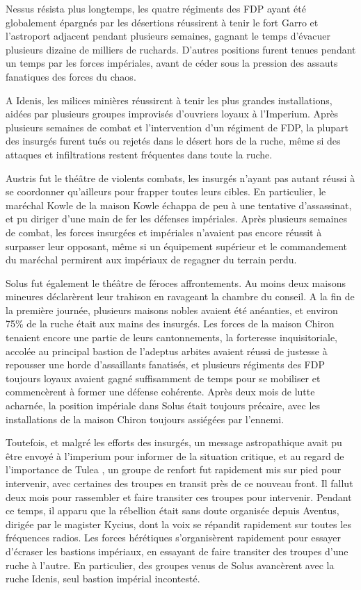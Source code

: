 \documentclass[10pt,a4paper]{book}
\newcommand{\zone}{Tulea }
\begin{document}
Nessus résista plus longtemps, les quatre régiments des FDP ayant été globalement épargnés par les désertions réussirent à tenir le fort Garro et l'astroport adjacent pendant plusieurs semaines, gagnant le temps d'évacuer plusieurs dizaine de milliers de ruchards. D'autres positions furent tenues pendant un temps par les forces impériales, avant de céder sous la pression des assauts fanatiques des forces du chaos.

A Idenis, les milices minières réussirent à tenir les plus grandes installations, aidées par plusieurs groupes improvisés d'ouvriers loyaux à l'Imperium. Après plusieurs semaines de combat et l'intervention d'un régiment de FDP, la plupart des insurgés furent tués ou rejetés dans le désert hors de la ruche, même si des attaques et infiltrations restent fréquentes dans toute la ruche.

Austris fut le théâtre de violents combats, les insurgés n'ayant pas autant réussi à se coordonner qu'ailleurs pour frapper toutes leurs cibles. En particulier, le maréchal Kowle de la maison Kowle échappa de peu à une tentative d'assassinat, et pu diriger d'une main de fer les défenses impériales. Après plusieurs semaines de combat, les forces insurgées et impériales n'avaient pas encore réussit à surpasser leur opposant, même si un équipement supérieur et le commandement du maréchal permirent aux impériaux de regagner du terrain perdu.

Solus fut également le théâtre de féroces affrontements. Au moins deux maisons mineures déclarèrent leur trahison en ravageant la chambre du conseil. A la fin de la première journée, plusieurs maisons nobles avaient été anéanties, et environ 75\% de la ruche était aux mains des insurgés. Les forces de la maison Chiron tenaient encore une partie de leurs cantonnements, la forteresse inquisitoriale, accolée au principal bastion de l'adeptus arbites avaient réussi de justesse à repousser une horde d'assaillants fanatisés, et plusieurs régiments des FDP toujours loyaux avaient gagné suffisamment de temps pour se mobiliser et commencèrent à former une défense cohérente. Après deux mois de lutte acharnée, la position impériale dans Solus était toujours précaire, avec les installations de la maison Chiron toujours assiégées par l'ennemi.

Toutefois, et malgré les efforts des insurgés, un message astropathique avait pu être envoyé à l'imperium pour informer de la situation critique, et au regard de l'importance de \zone , un groupe de renfort fut rapidement mis sur pied pour intervenir, avec certaines des troupes en transit près de ce nouveau front. Il fallut deux mois pour rassembler et faire transiter ces troupes pour intervenir. 
Pendant ce temps, il apparu que la rébellion était sans doute organisée depuis Aventus, dirigée par le magister Kycius, dont la voix se répandit rapidement sur toutes les fréquences radios. Les forces hérétiques s'organisèrent rapidement pour essayer d'écraser les bastions impériaux, en essayant de faire transiter des troupes d'une ruche à l'autre. En particulier, des groupes venus de Solus avancèrent avec la ruche Idenis, seul bastion impérial incontesté.
\end{document}

